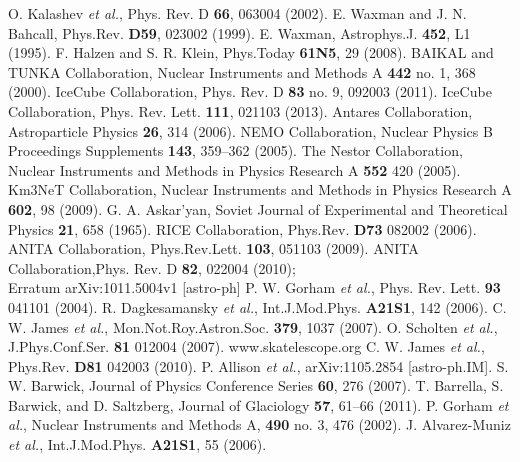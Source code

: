 \begin{thebibliography}{1}
 O. Kalashev {\it et al.}, Phys. Rev. D \textbf{66}, 063004 (2002).
 E. Waxman and J. N. Bahcall, Phys.Rev. \textbf{D59},  023002 (1999).
  E. Waxman,  Astrophys.J. \textbf{452},  L1 (1995).
 F. Halzen and S. R. Klein, Phys.Today \textbf{61N5}, 29 (2008).
 BAIKAL and TUNKA Collaboration, Nuclear Instruments and Methods A \textbf{442} no. 1, 368 (2000).
 IceCube Collaboration, Phys. Rev. D \textbf{83} no. 9,  092003 (2011).
 IceCube Collaboration, Phys. Rev. Lett. \textbf{111}, 021103 (2013).
 Antares Collaboration, Astroparticle Physics \textbf{26}, 314 (2006).
 NEMO Collaboration, Nuclear Physics B Proceedings Supplements \textbf{143},  359–362 (2005).
  The Nestor Collaboration,  Nuclear Instruments and Methods in Physics Research A \textbf{552} 420 (2005).
  Km3NeT Collaboration, Nuclear Instruments and Methods in Physics Research A \textbf{602}, 98 (2009).
  G. A. Askar’yan, Soviet Journal of Experimental and Theoretical Physics \textbf{21}, 658 (1965).
 RICE Collaboration, Phys.Rev. \textbf{D73}  082002 (2006).
 ANITA Collaboration, Phys.Rev.Lett. \textbf{103},  051103 (2009).
ANITA Collaboration,Phys. Rev. D \textbf{82}, 022004 (2010);\\
Erratum arXiv:1011.5004v1 [astro-ph]
  P. W. Gorham {\it et al.},  Phys. Rev. Lett. \textbf{93}  041101 (2004).
 R. Dagkesamansky {\it et al.}, Int.J.Mod.Phys. \textbf{A21S1},  142 (2006).
 C. W. James {\it et al.}, Mon.Not.Roy.Astron.Soc. \textbf{379}, 1037 (2007).
  O. Scholten {\it et al.}, J.Phys.Conf.Ser. \textbf{81}  012004 (2007).
 www.skatelescope.org
  C. W. James {\it et al.}, Phys.Rev. \textbf{D81}  042003 (2010).
 P. Allison {\it et al.}, arXiv:1105.2854 [astro-ph.IM].
 S. W. Barwick, Journal of Physics Conference Series \textbf{60}, 276 (2007).
  T. Barrella, S. Barwick, and D. Saltzberg, Journal of Glaciology \textbf{57}, 61–66 (2011).
  P. Gorham {\it et al.}, Nuclear Instruments and Methods A, \textbf{490} no. 3,  476 (2002).
 J. Alvarez-Muniz {\it et al.}, Int.J.Mod.Phys. \textbf{A21S1}, 55 (2006).

\end{thebibliography}
